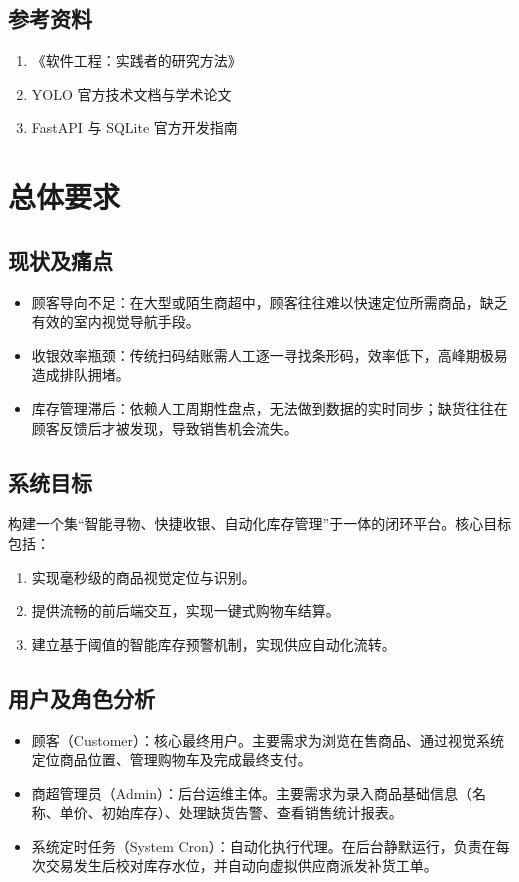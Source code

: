 \subsection{参考资料}
\begin{enumerate}[leftmargin=2em]
  \item 《软件工程：实践者的研究方法》
  \item YOLO 官方技术文档与学术论文
  \item FastAPI 与 SQLite 官方开发指南
\end{enumerate}

\section{总体要求}

\subsection{现状及痛点}
\begin{itemize}[leftmargin=2em]
  \item 顾客导向不足：在大型或陌生商超中，顾客往往难以快速定位所需商品，缺乏有效的室内视觉导航手段。
  \item 收银效率瓶颈：传统扫码结账需人工逐一寻找条形码，效率低下，高峰期极易造成排队拥堵。
  \item 库存管理滞后：依赖人工周期性盘点，无法做到数据的实时同步；缺货往往在顾客反馈后才被发现，导致销售机会流失。
\end{itemize}

\subsection{系统目标}
构建一个集“智能寻物、快捷收银、自动化库存管理”于一体的闭环平台。核心目标包括：
\begin{enumerate}[leftmargin=2em]
  \item 实现毫秒级的商品视觉定位与识别。
  \item 提供流畅的前后端交互，实现一键式购物车结算。
  \item 建立基于阈值的智能库存预警机制，实现供应自动化流转。
\end{enumerate}

\subsection{用户及角色分析}
\begin{itemize}[leftmargin=2em]
  \item 顾客（Customer）：核心最终用户。主要需求为浏览在售商品、通过视觉系统定位商品位置、管理购物车及完成最终支付。
  \item 商超管理员（Admin）：后台运维主体。主要需求为录入商品基础信息（名称、单价、初始库存）、处理缺货告警、查看销售统计报表。
  \item 系统定时任务（System Cron）：自动化执行代理。在后台静默运行，负责在每次交易发生后校对库存水位，并自动向虚拟供应商派发补货工单。
\end{itemize}

